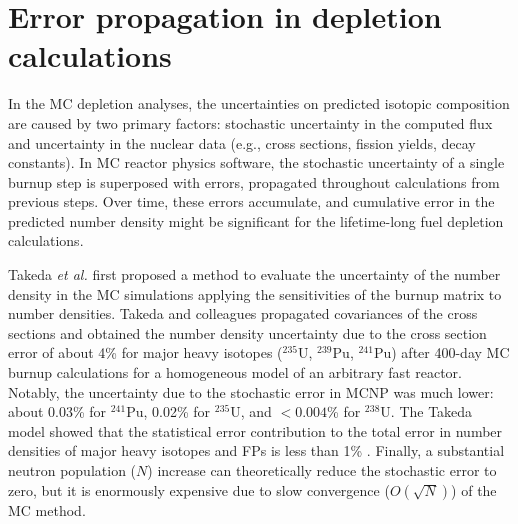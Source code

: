 \chapter{Error propagation in depletion calculations}\label{ch:uq}
In the \gls{MC} depletion analyses, the uncertainties on predicted isotopic 
composition are caused by two primary factors: stochastic uncertainty in 
the computed flux and uncertainty in the nuclear data (e.g., cross sections, 
fission yields, decay constants). In \gls{MC} reactor physics software, the 
stochastic uncertainty of a single burnup step is superposed with errors, 
propagated throughout calculations from previous steps. Over time, these 
errors accumulate, and cumulative error in the predicted number density might 
be significant for the lifetime-long fuel depletion calculations.

Takeda \emph{et al.} first proposed a method to evaluate the uncertainty of 
the number density in the \gls{MC} simulations applying the sensitivities of 
the burnup matrix to number densities. Takeda and colleagues propagated 
covariances of the cross sections and obtained the number density uncertainty 
due to the cross section error of about 4\% for major heavy isotopes 
($^{235}$U, $^{239}$Pu, $^{241}$Pu) after 400-day \gls{MC} burnup calculations 
for a homogeneous model of an arbitrary fast reactor. 
Notably, the uncertainty due to the stochastic error in MCNP 
was much lower: about 0.03\% for $^{241}$Pu, 0.02\% for $^{235}$U, and 
$<0.004$\% for $^{238}$U. The Takeda model showed that the statistical error 
contribution to the total error in number densities of major heavy isotopes 
and \glspl{FP} is less than 1\% \cite{takeda_estimation_1999}. Finally, 
a substantial neutron population ($N$) increase can theoretically reduce the 
stochastic error to zero, but it is enormously expensive due to slow 
convergence ($O(\sqrt{N})$) of the MC method.

